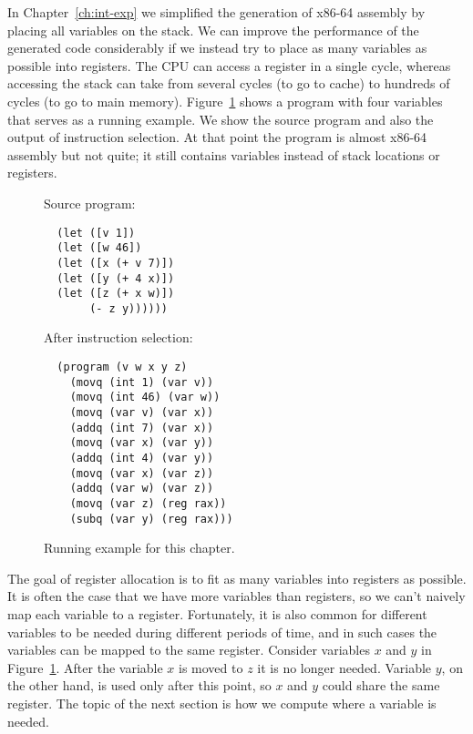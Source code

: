 \documentclass[12pt]{book}
\begin{document}
In Chapter~\ref{ch:int-exp} we simplified the generation of x86-64
assembly by placing all variables on the stack. We can improve the
performance of the generated code considerably if we instead try to
place as many variables as possible into registers.  The CPU can
access a register in a single cycle, whereas accessing the stack can
take from several cycles (to go to cache) to hundreds of cycles (to go
to main memory).  Figure~\ref{fig:reg-eg} shows a program with four
variables that serves as a running example. We show the source program
and also the output of instruction selection. At that point the
program is almost x86-64 assembly but not quite; it still contains
variables instead of stack locations or registers.

\begin{figure}
\begin{minipage}{0.45\textwidth}
Source program:
\begin{lstlisting}
  (let ([v 1])
  (let ([w 46])
  (let ([x (+ v 7)])
  (let ([y (+ 4 x)])
  (let ([z (+ x w)])
       (- z y))))))
\end{lstlisting}
\end{minipage}
\begin{minipage}{0.45\textwidth}
After instruction selection:
\begin{lstlisting}
  (program (v w x y z)
    (movq (int 1) (var v))
    (movq (int 46) (var w))
    (movq (var v) (var x))
    (addq (int 7) (var x))
    (movq (var x) (var y))
    (addq (int 4) (var y))
    (movq (var x) (var z))
    (addq (var w) (var z))
    (movq (var z) (reg rax))
    (subq (var y) (reg rax)))
\end{lstlisting}
\end{minipage}
\caption{Running example for this chapter.}
\label{fig:reg-eg}
\end{figure}

The goal of register allocation is to fit as many variables into
registers as possible. It is often the case that we have more
variables than registers, so we can't naively map each variable to a
register. Fortunately, it is also common for different variables to be
needed during different periods of time, and in such cases the
variables can be mapped to the same register.  Consider variables $x$
and $y$ in Figure~\ref{fig:reg-eg}.  After the variable $x$ is moved
to $z$ it is no longer needed.  Variable $y$, on the other hand, is
used only after this point, so $x$ and $y$ could share the same
register. The topic of the next section is how we compute where a
variable is needed.
\end{document}
